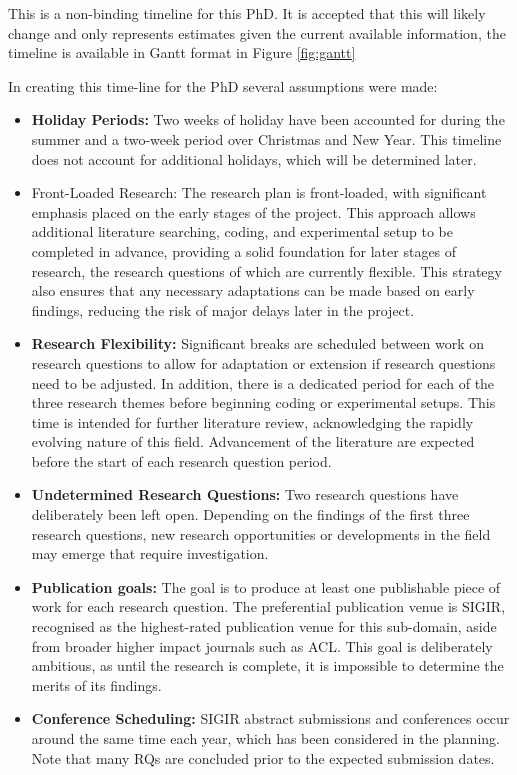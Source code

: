 \documentclass[../main.tex]{subfiles}
\begin{document}
This is a non-binding timeline for this PhD. It is accepted that this will likely change and only represents estimates given the current available information, the timeline is available in Gantt format in Figure \ref{fig:gantt}

In creating this time-line for the PhD several assumptions were made:
\begin{itemize}
    \item \textbf{Holiday Periods:} Two weeks of holiday have been accounted for during the summer and a two-week period over Christmas and New Year. This timeline does not account for additional holidays, which will be determined later.
    \item Front-Loaded Research: The research plan is front-loaded, with significant emphasis placed on the early stages of the project. This approach allows additional literature searching, coding, and experimental setup to be completed in advance, providing a solid foundation for later stages of research, the research questions of which are currently flexible. This strategy also ensures that any necessary adaptations can be made based on early findings, reducing the risk of major delays later in the project. 

        \item \textbf{Research Flexibility:} Significant breaks are scheduled between work on research questions to allow for adaptation or extension if research questions need to be adjusted. In addition, there is a dedicated period for each of the three research themes before beginning coding or experimental setups. This time is intended for further literature review, acknowledging the rapidly evolving nature of this field. Advancement of the literature are expected before the start of each research question period.
    \item \textbf{Undetermined Research Questions:} Two research questions have deliberately been left open. Depending on the findings of the first three research questions, new research opportunities or developments in the field may emerge that require investigation.
    \item \textbf{Publication goals:} The goal is to produce at least one publishable piece of work for each research question. The preferential publication venue is SIGIR, recognised as the highest-rated publication venue for this sub-domain, aside from broader higher impact journals such as ACL. This goal is deliberately ambitious, as until the research is complete, it is impossible to determine the merits of its findings.
    \item \textbf{Conference Scheduling:} SIGIR abstract submissions and conferences occur around the same time each year, which has been considered in the planning. Note that many RQs are concluded prior to the expected submission dates.

\end{itemize}
\end{document}
